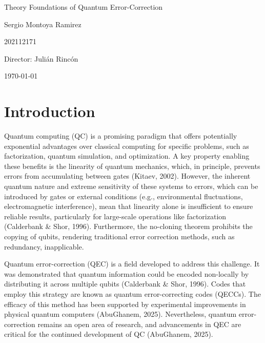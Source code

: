 \documentclass[12pt]{article}
\begin{document}
\begin{center}
  \Huge
  Theory Foundations of Quantum Error-Correction

  \vspace{3mm}
  \Large Sergio Montoya Ramirez

  \large
  202112171


  \vspace{2mm}
  \Large
  Director: Juli\'an Rinc\'on

  \normalsize
  \vspace{2mm}

  \today
\end{center}


\normalsize

\section{Introduction}

Quantum computing (QC) is a promising paradigm that offers potentially exponential advantages over classical computing for specific problems, such as factorization, quantum simulation, and optimization. A key property enabling these benefits is the linearity of quantum mechanics, which, in principle, prevents errors from accumulating between gates (Kitaev, 2002). However, the inherent quantum nature and extreme sensitivity of these systems to errors, which can be introduced by gates or external conditions (e.g., environmental fluctuations, electromagnetic interference), mean that linearity alone is insufficient to ensure reliable results, particularly for large-scale operations like factorization (Calderbank \& Shor, 1996). Furthermore, the no-cloning theorem prohibits the copying of qubits, rendering traditional error correction methods, such as redundancy, inapplicable.

Quantum error-correction (QEC) is a field developed to address this challenge. It was demonstrated that quantum information could be encoded non-locally by distributing it across multiple qubits (Calderbank \& Shor, 1996). Codes that employ this strategy are known as quantum error-correcting codes (QECCs). The efficacy of this method has been supported by experimental improvements in physical quantum computers (AbuGhanem, 2025). Nevertheless, quantum error-correction remains an open area of research, and advancements in QEC are critical for the continued development of QC (AbuGhanem, 2025).
\end{document}
